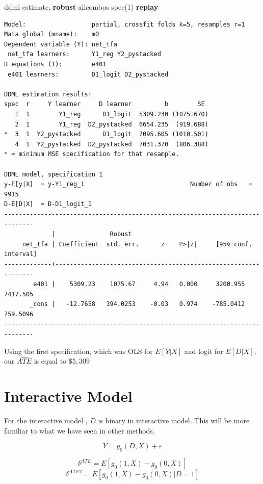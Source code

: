 \documentclass[
]{book}
\newenvironment{Shaded}{\begin{snugshade}}{\end{snugshade}}
\newcommand{\FunctionTok}[1]{\textcolor[rgb]{0.13,0.29,0.53}{\textbf{#1}}}
\newcommand{\KeywordTok}[1]{\textcolor[rgb]{0.13,0.29,0.53}{\textbf{#1}}}
\newcommand{\NormalTok}[1]{#1}
\begin{document}
\begin{Shaded}
\begin{Highlighting}[]
\NormalTok{ddml estimate, }\KeywordTok{robust}\NormalTok{ allcombos spec(1) }\FunctionTok{replay}
\end{Highlighting}
\end{Shaded}

\begin{verbatim}
Model:                  partial, crossfit folds k=5, resamples r=1
Mata global (mname):    m0
Dependent variable (Y): net_tfa
 net_tfa learners:      Y1_reg Y2_pystacked
D equations (1):        e401
 e401 learners:         D1_logit D2_pystacked

DDML estimation results:
spec  r     Y learner     D learner         b        SE 
   1  1        Y1_reg      D1_logit  5309.230 (1075.670)
   2  1        Y1_reg  D2_pystacked  6654.235  (919.688)
*  3  1  Y2_pystacked      D1_logit  7095.605 (1010.501)
   4  1  Y2_pystacked  D2_pystacked  7031.370  (806.388)
* = minimum MSE specification for that resample.

DDML model, specification 1
y-E[y|X]  = y-Y1_reg_1                             Number of obs   =      9915
D-E[D|X]  = D-D1_logit_1 
------------------------------------------------------------------------------
             |               Robust
     net_tfa | Coefficient  std. err.      z    P>|z|     [95% conf. interval]
-------------+----------------------------------------------------------------
        e401 |    5309.23    1075.67     4.94   0.000     3200.955    7417.505
       _cons |   -12.7658   394.0253    -0.03   0.974    -785.0412    759.5096
------------------------------------------------------------------------------
\end{verbatim}

Using the first specification, which was OLS for \(E[Y|X]\) and logit for \(E[D|X]\), our \(\widehat{ATE}\) is equal to \(\$5,309\)

\chapter{Interactive Model}\label{interactive-model}

For the interactive model , \(D\) is binary in interactive model. This will be more familiar to what we have seen in other methods.

\[ Y=g_{0}(D,X)+\varepsilon \]

\[ \delta^{ATE}=E[g_0(1,X)-g_0(0,X)] \]
\[ \delta^{ATET}=E[g_0(1,X)-g_0(0,X)|D=1] \]
\end{document}
